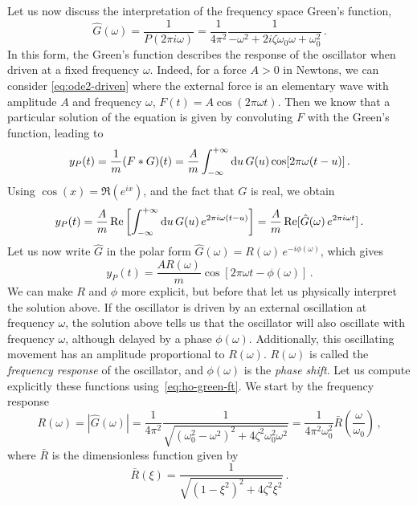 Let us now discuss the interpretation of the frequency space Green's function, \ie
\begin{equation}
  \boxed{
    \hat{G}(\omega)=\frac{1}{P(2\pi i\omega)}=\frac{1}{4\pi^2}
    \frac{1}{-\omega^2+2i\zeta\omega_0\omega+\omega_0^2}}\,.
  \label{eq:ho-green-ft}
\end{equation}
In this form, the Green's function describes the response of the oscillator when driven at
a fixed frequency $\omega$. Indeed, for a force $A>0$ in Newtons, we can consider
\cref{eq:ode2-driven} where the external force is an elementary wave with amplitude $A$
and frequency $\omega$, \ie $F(t)=A\cos(2\pi\omega t)$. Then we know that a particular
solution of the equation is given by convoluting $F$ with the Green's function, leading to
\begin{equation}
  y_P(t)=\frac{1}{m}(F\ast G)(t)=\frac{A}{m}\int_{-\infty}^{+\infty}\mathrm{d}{u}\,G(u)\cos[2\pi\omega(t-u)]\,.
\end{equation}
Using $\cos(x)=\Re(e^{ix})$, and the fact that $G$ is real, we obtain
\begin{equation}
  y_P(t)=\frac{A}{m}\operatorname{Re}\left[\int_{-\infty}^{+\infty}\mathrm{d}{u}\,G(u)\,e^{2\pi i\omega(t-u)}\right]
  =\frac{A}{m}\operatorname{Re}[\hat{G}(\omega)\,e^{2\pi i\omega t}]\,.
\end{equation}
Let us now write $\hat{G}$ in the polar form
$\hat{G}(\omega)=R(\omega)\,e^{-i\phi(\omega)}$, which gives
\begin{equation}
  y_P(t)=\frac{AR(\omega)}{m}\cos[2\pi\omega t-\phi(\omega)]\,.
\end{equation}
We can make $R$ and $\phi$ more explicit, but before that let us physically interpret the
solution above. If the oscillator is driven by an external oscillation at frequency
$\omega$, the solution above tells us that the oscillator will also oscillate with
frequency $\omega$, although delayed by a phase $\phi(\omega)$. Additionally, this
oscillating movement has an amplitude proportional to $R(\omega)$. $R(\omega)$ is called
the \emph{frequency response} of the oscillator, and $\phi(\omega)$ is the \emph{phase
  shift}. Let us compute explicitly these functions using~\cref{eq:ho-green-ft}. We start by
the frequency response
\begin{equation}
  R(\omega)=|\hat{G}(\omega)|=\frac{1}{4\pi^2}
  \frac{1}{\sqrt{(\omega_0^2-\omega^2)^2+4\zeta^2\omega_0^2\omega^2}}
  =\frac{1}{4\pi^2\omega_0^2}\bar{R}\left(\frac{\omega}{\omega_0}\right)\,,
\end{equation}
where $\bar{R}$ is the dimensionless function given by
\begin{equation}
  \boxed{
    \bar{R}(\xi)=\frac{1}{\sqrt{(1-\xi^2)^2+4\zeta^2\xi^2}}\,.}
  \label{eq:ho-response}
\end{equation}
